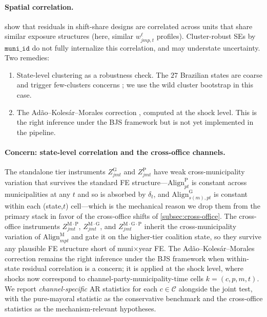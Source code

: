 \documentclass{article}
\newcommand{\Align}{\mathrm{Align}}
\theoremstyle{plain}
\theoremstyle{definition}
\theoremstyle{remark}
\begin{document}
\paragraph{Spatial correlation.}
\citet{adao2019shift} show that residuals in shift-share designs are
correlated across units that share similar exposure structures (here, similar
$w^{\ell}_{jmp,t}$ profiles). Cluster-robust SEs by $\texttt{muni\_id}$ do not
fully internalize this correlation, and may understate uncertainty. Two
remedies:
\begin{enumerate}[leftmargin=*,nosep]
\item State-level clustering as a robustness check. The $27$ Brazilian states
  are coarse and trigger few-clusters concerns
  \citep{carter2017asymptotic}; we use the wild cluster bootstrap
  in this case.
\item The Adão--Kolesár--Morales correction \citep{adao2019shift}, computed at
  the shock level. This is the right inference under the BJS framework but is
  not yet implemented in the pipeline.
\end{enumerate}

\paragraph{Concern: state-level correlation and the cross-office channels.}
The standalone tier instruments $Z^{\mathrm{G}}_{jmt}$ and
$Z^{\mathrm{P}}_{jmt}$ have weak cross-municipality variation that
survives the standard FE structure---$\Align^{\mathrm{P}}_{pt}$ is
constant across municipalities at any $t$ and so is absorbed by
$\delta_t$, and $\Align^{\mathrm{G}}_{s(m),pt}$ is constant within each
(state,$t$) cell---which is the mechanical reason we drop them from the
primary stack in favor of the cross-office shifts of
\autoref{subsec:cross-office}. The cross-office instruments
$Z^{\mathrm{M{\cdot}P}}_{jmt}$, $Z^{\mathrm{M{\cdot}G}}_{jmt}$, and
$Z^{\mathrm{M{\cdot}G{\cdot}P}}_{jmt}$ inherit the cross-municipality
variation of $\Align^{\mathrm{M}}_{mpt}$ and gate it on the higher-tier
coalition state, so they survive any plausible FE structure short of
muni$\times$year FE. The Adão--Kolesár--Morales correction
\citep{adao2019shift} remains the right inference under the BJS
framework when within-state residual correlation is a concern; it is
applied at the shock level, where shocks now correspond to
channel-party-municipality-time cells $k=(c,p,m,t)$. We report
\emph{channel-specific} AR statistics for each $c\in\mathcal{C}$ alongside
the joint test, with the pure-mayoral statistic as the conservative
benchmark and the cross-office statistics as the mechanism-relevant
hypotheses.
\end{document}
